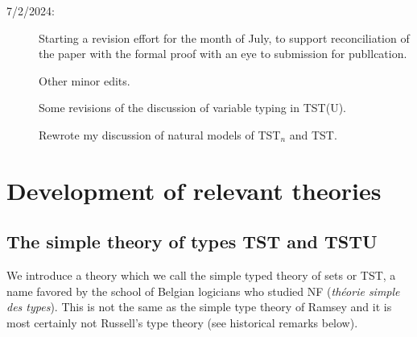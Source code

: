 \documentclass[112pt]{article}
\theoremstyle{definition}
\theoremstyle{remark}
\newenvironment{annot}{\begin{center}\color{blue}\sl}{\end{center}}
\begin{document}
\begin{description}
\item[7/2/2024:]  Starting a revision effort for the month of July, to support reconciliation of the paper with the formal proof with an eye to submission for publlcation.



Other minor edits.

Some revisions of the discussion of variable typing in TST(U).

Rewrote my discussion of natural models of TST$_n$ and TST.















\end{description}


\newpage

\section{Development of relevant theories}



\subsection{The simple theory of types TST and TSTU}

We introduce a theory which we call the simple typed theory of sets or TST, a name favored by the school of Belgian logicians who studied NF ({\em th\'eorie simple des types}).  This is not the same as the simple type theory of Ramsey and it is most certainly not Russell's type theory  (see historical remarks below).

\begin{comment}
\begin{annot}
  Canonicalise uses of `first order' vs.\ `first order'; `typed theory' vs.\ `type theory'; `well-formed' vs.\ `well-formed'; `Freedom of Action' vs.\ `Freedom of Action'; `NF' vs.\ `NF'; {\tt \textbackslash em} vs. double quotes for introducing definitions.

Holmes:  simple typed theory of sets is simply a consistent rhetorical usage of mine.

The others I am standardizing.

\end{annot}
\end{comment}
\end{document}
